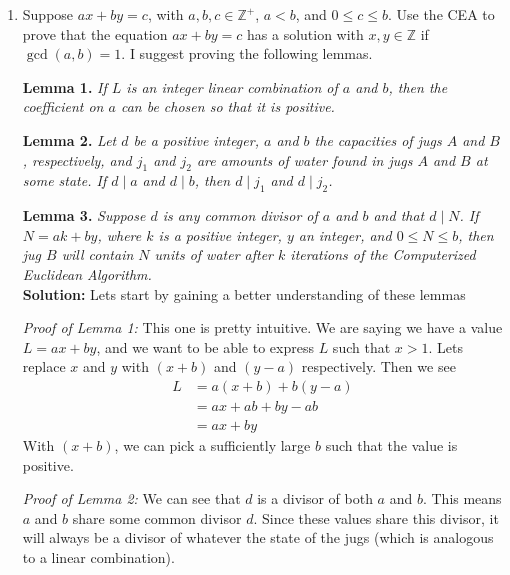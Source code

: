 \documentclass[10pt]{article}
\newcommand{\Z}{\mathbb{Z}}
\newcommand{\solution}{\color{blue}\textbf{Solution:} \color{black}}
\begin{document}
\begin{enumerate}
		\item Suppose $ax+by = c$, with $a,b,c \in \Z^+$, $a < b$, and $0 \leq c \leq b$.  
		Use the CEA to prove that the equation $ax+by = c$ has a solution with $x, y \in \Z$ if $\gcd(a,b) =1$.  
		I suggest proving the following lemmas.
		
		{\bf Lemma 1.} \emph{If $L$ is an integer linear combination of $a$ and $b$, then the coefficient on $a$ can be chosen so that it is positive.}
		
		{\bf Lemma 2.} \emph{Let $d$ be a positive integer, $a$ and $b$ the capacities of jugs $A$ and $B$, respectively, and $j_1$ and $j_2$ are amounts of water found in jugs $A$ and $B$ at some state. If $d \mid a$ and $d \mid b$, then $d \mid j_1$ and $d \mid j_2$.} 
		
		{\bf Lemma 3.} \emph{Suppose $d$ is any common divisor of $a$ and $b$ and that $d \mid N$. If $N = ak + by$, where $k$ is a positive integer, $y$ an integer, and $0 \leq N \leq b$, then jug $B$ will contain $N$ units of water after $k$ iterations of the Computerized Euclidean Algorithm.}\\

		\solution Lets start by gaining a better understanding of these lemmas

        \textit{Proof of Lemma 1:} This one is pretty intuitive. We are saying we have a value $L = ax + by$, and we want to be able to express $L$ such that $x > 1$. 	Lets replace $x$ and $y$ with $(x + b)$	 and $(y - a)$ respectively. Then we see
        \begin{align*}
            L &= a(x+b) + b(y - a)\\
              &= ax + ab + by - ab\\
              &= ax + by
        \end{align*}
        With $(x + b)$, we can pick a sufficiently large $b$ such that the value is positive.

        \textit{Proof of Lemma 2:} We can see that $d$ is a divisor of both $a$ and $b$. This means $a$ and $b$ share some common divisor $d$. Since these values share this divisor, it will always be a divisor of whatever the state of the jugs (which is analogous to a linear combination). 


\end{enumerate}
\end{document}
